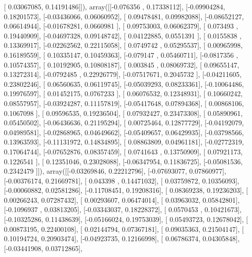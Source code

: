 \documentclass{article}
\begin{document}
       [ 0.03067085,  0.14191486]]), array([[-0.076356  ,  0.17338112],
       [-0.09904284,  0.18201573],
       [-0.03436066,  0.06060952],
       [ 0.09478481,  0.09982088],
       [-0.08652127,  0.06614944],
       [-0.01678281,  0.0660981 ],
       [ 0.09753003,  0.06062379],
       [ 0.073493  ,  0.19440909],
       [-0.04697328,  0.09148742],
       [ 0.04122885,  0.0551391 ],
       [ 0.0155838 ,  0.13369917],
       [-0.02262562,  0.22115058],
       [ 0.0749742 ,  0.05295537],
       [ 0.00965998,  0.16189559],
       [ 0.10335147,  0.10459363],
       [-0.079147  ,  0.05460711],
       [-0.0817356 ,  0.10574357],
       [ 0.10192905,  0.10808187],
       [ 0.003845  ,  0.08069732],
       [ 0.09655147,  0.13272314],
       [-0.0792485 ,  0.22926779],
       [-0.07517671,  0.2045732 ],
       [-0.04211605,  0.23802246],
       [ 0.06560635,  0.06119745],
       [-0.05039293,  0.08233361],
       [-0.10064486,  0.19976597],
       [ 0.01452175,  0.0767233 ],
       [ 0.06076532,  0.12348931],
       [ 0.10660242,  0.08557957],
       [-0.03924287,  0.11157819],
       [-0.05417648,  0.07894368],
       [ 0.00868106,  0.1067098 ],
       [ 0.09596535,  0.19236504],
       [ 0.07932427,  0.23473308],
       [ 0.05890961,  0.05450502],
       [-0.06436636,  0.21195294],
       [ 0.00725464,  0.12877729],
       [-0.04192079,  0.04989581],
       [-0.02868965,  0.04649662],
       [-0.05409657,  0.06429935],
       [-0.03798566,  0.13963593],
       [-0.11131972,  0.14834895],
       [ 0.08863809,  0.04961181],
       [-0.02772319,  0.17064744],
       [-0.07652876,  0.08357459],
       [ 0.0741643 ,  0.13750909],
       [ 0.07921173,  0.1226541 ],
       [ 0.12351046,  0.23028088],
       [-0.06347954,  0.11836725],
       [-0.05081536,  0.2342479 ]]), array([[-0.03269846,  0.22212796],
       [-0.07693077,  0.07860977],
       [-0.00376174,  0.21669781],
       [ 0.043398  ,  0.14471032],
       [ 0.03759872,  0.10356093],
       [-0.00060882,  0.02581286],
       [-0.11708451,  0.19208316],
       [ 0.08369238,  0.19236203],
       [ 0.00266243,  0.07287432],
       [ 0.00293607,  0.06474014],
       [ 0.03963032,  0.05842801],
       [-0.1096937 ,  0.03813205],
       [-0.03343037,  0.18228372],
       [ 0.0570453 ,  0.10421673],
       [-0.10325286,  0.11438639],
       [-0.05166024,  0.19753039],
       [ 0.05493723,  0.12678042],
       [ 0.00873195,  0.22400108],
       [ 0.02144794,  0.07367181],
       [ 0.09035363,  0.21504147],
       [ 0.10194724,  0.20903474],
       [-0.04923735,  0.12166998],
       [ 0.06786374,  0.04305848],
       [-0.03441908,  0.03712865],
\end{document}

